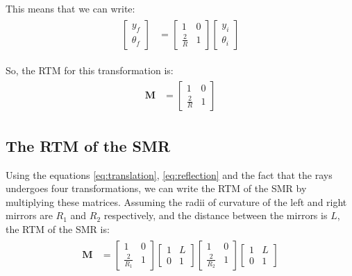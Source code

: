 \documentclass[12pt]{article}
\begin{document}
This means that we can write:
\begin{align}
    \begin{split}
        \begin{bmatrix}
            y_f \\
            \theta_f
        \end{bmatrix} & = \begin{bmatrix}
            1           & 0 \\
            \frac{2}{R} & 1
        \end{bmatrix} \begin{bmatrix}
            y_i \\
            \theta_i
        \end{bmatrix}
    \end{split}
\end{align}

So, the RTM for this transformation is:
\begin{align}
    \label{eq:reflection}
    \begin{split}
        \mathbf{M} & = \begin{bmatrix}
            1           & 0 \\
            \frac{2}{R} & 1
        \end{bmatrix}
    \end{split}
\end{align}

\subsection{The RTM of the SMR}
Using the equations \ref{eq:translation}, \ref{eq:reflection} and the fact that the rays undergoes four transformations, we can write the RTM of the SMR by multiplying these matrices. Assuming the radii of curvature of the left and right mirrors are \(R_1\) and \(R_2\) respectively, and the distance between the mirrors is \(L\), the RTM of the SMR is:
\begin{align}
    \label{fig:RTM-SMR}
    \begin{split}
        \mathbf{M} & = \begin{bmatrix}
            1             & 0 \\
            \frac{2}{R_1} & 1
        \end{bmatrix}
        \begin{bmatrix}
            1 & L \\
            0 & 1
        \end{bmatrix}
        \begin{bmatrix}
            1             & 0 \\
            \frac{2}{R_2} & 1
        \end{bmatrix}
        \begin{bmatrix}
            1 & L \\
            0 & 1
        \end{bmatrix}
    \end{split}
\end{align}
\end{document}
